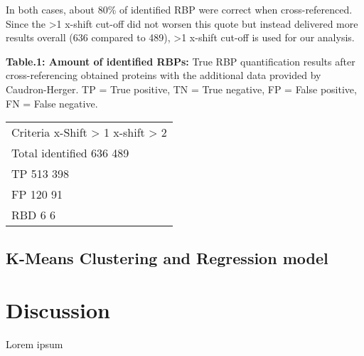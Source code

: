 \documentclass[
]{article}
\begin{document}
In both cases, about 80\% of identified RBP were correct when
cross-referenced. Since the \textgreater1 x-shift cut-off did not worsen
this quote but instead delivered more results overall (636 compared to
489), \textgreater1 x-shift cut-off is used for our analysis.

\textbf{Table.1: Amount of identified RBPs:} True RBP quantification
results after cross-referencing obtained proteins with the additional
data provided by Caudron-Herger. TP = True positive, TN = True negative,
FP = False positive, FN = False negative.

\begin{longtable}[]{@{}l@{}}
\toprule
\endhead
Criteria \textbar{} x-Shift \textgreater{} 1 \textbar{} x-shift
\textgreater{} 2 \textbar{} \\
Total identified \textbar{} 636 \textbar{} 489 \textbar{} \\
TP \textbar{} 513 \textbar{} 398 \textbar{} \\
FP \textbar{} 120\textbar{} 91 \textbar{} \\
RBD\textbar{} 6 \textbar{} 6\textbar{} \\
\bottomrule
\end{longtable}

\hypertarget{k-means-clustering-and-regression-model}{%
\subsection{K-Means Clustering and Regression
model}\label{k-means-clustering-and-regression-model}}

\hypertarget{discussion}{%
\section{Discussion}\label{discussion}}

Lorem ipsum
\end{document}
